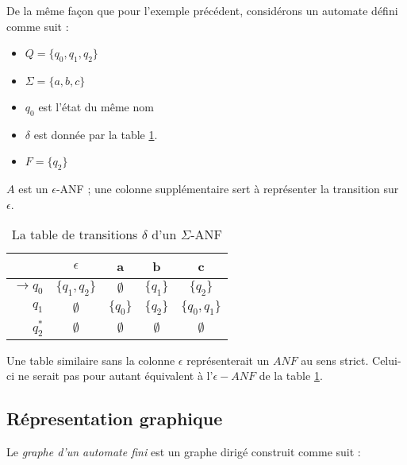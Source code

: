 \begin{example}\label{ex:anf}
	 De la même façon que pour l'exemple précédent, considérons un automate \automaton défini comme suit :

\begin{itemize}
	\item $Q=\{q_0,q_1,q_2\}$
	\item $\Sigma=\{a,b,c\}$
	\item $q_0$ est l'état du même nom
	\item $\delta$ est donnée par la table \ref{table:eanfdelta}.
	\item $F=\{q_2\}$
\end{itemize}

$A$ est un $\epsilon$-ANF ; une colonne supplémentaire sert à représenter la transition sur $\epsilon$.

\begin{table}[H]
	\centering
	\begin{tabular}{|r||c|c|c|c|}
		\hline
		&$\epsilon$&a&b&c\\
		\hline\hline
		$\rightarrow q_0$&$\{q_1,q_2\}$&$\emptyset$&$\{q_1\}$&$\{q_2\}$\\\hline
		$q_1$&$\emptyset$&$\{q_0\}$&$\{q_2\}$&$\{q_0,q_1\}$\\\hline
		$q_2^*$&$\emptyset$&$\emptyset$&$\emptyset$&$\emptyset$\\\hline
	\end{tabular}
	\caption{La table de transitions $\delta$ d'un $\Sigma$-ANF}
	\label{table:eanfdelta}
\end{table}

Une table similaire sans la colonne $\epsilon$ représenterait un $ANF$ au sens strict. Celui-ci ne serait pas pour autant équivalent à l'$\epsilon-ANF$ de la table \ref{table:eanfdelta}.

\end{example}




\subsection{Répresentation graphique}\label{adf:repr}
Le \emph{graphe d'un automate fini} \automaton est un graphe dirigé construit comme suit :

